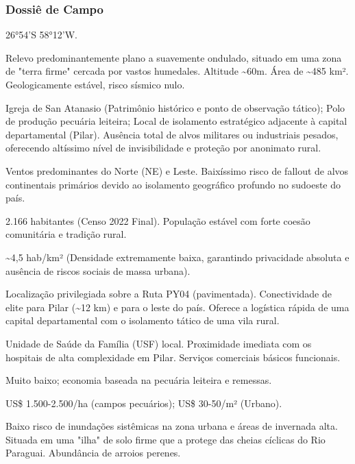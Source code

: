 \subsubsection{Dossiê de Campo}
\begin{description}[style=nextline,leftmargin=0.5cm,font=\bfseries]
\item[Coordenadas]  26°54'S 58°12'W.
\item[Topografia]  Relevo predominantemente plano a suavemente ondulado, situado em uma zona de "terra firme" cercada por vastos humedales. Altitude \textasciitilde 60m. Área de \textasciitilde 485 km². Geologicamente estável, risco sísmico nulo.
\item[Alvos Estratégicos]  Igreja de San Atanasio (Patrimônio histórico e ponto de observação tático); Polo de produção pecuária leiteira; Local de isolamento estratégico adjacente à capital departamental (Pilar). Ausência total de alvos militares ou industriais pesados, oferecendo altíssimo nível de invisibilidade e proteção por anonimato rural.
\item[Fallout]  Ventos predominantes do Norte (NE) e Leste. Baixíssimo risco de fallout de alvos continentais primários devido ao isolamento geográfico profundo no sudoeste do país.
\item[População]  2.166 habitantes (Censo 2022 Final). População estável com forte coesão comunitária e tradição rural.
\item[Densidade]  \textasciitilde 4,5 hab/\allowbreak km² (Densidade extremamente baixa, garantindo privacidade absoluta e ausência de riscos sociais de massa urbana).
\item[Vias de Acesso]  Localização privilegiada sobre a Ruta PY04 (pavimentada). Conectividade de elite para Pilar (\textasciitilde 12 km) e para o leste do país. Oferece a logística rápida de uma capital departamental com o isolamento tático de uma vila rural.
\item[Serviços]  Unidade de Saúde da Família (USF) local. Proximidade imediata com os hospitais de alta complexidade em Pilar. Serviços comerciais básicos funcionais.
\item[Custo de Vida]  Muito baixo; economia baseada na pecuária leiteira e remessas.
\item[Preço da Terra]  US\$ 1.500-2.500/\allowbreak ha (campos pecuários); US\$ 30-50/\allowbreak m² (Urbano).
\item[Hidrologia]  Baixo risco de inundações sistêmicas na zona urbana e áreas de invernada alta. Situada em uma "ilha" de solo firme que a protege das cheias cíclicas do Rio Paraguai. Abundância de arroios perenes.

\end{description}
